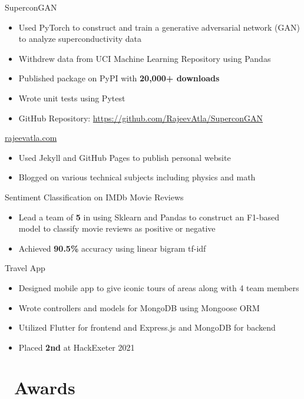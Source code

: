 \documentclass[12]{article}
\begin{document}
{SuperconGAN}
{
  \begin{itemize}
  \item Used PyTorch to construct and train a generative adversarial network (GAN) to analyze superconductivity data
  \item Withdrew data from UCI Machine Learning Repository using Pandas
  \item Published package on PyPI with \textbf{20,000+ downloads}
  \item Wrote unit tests using Pytest
  \item GitHub Repository: \url{https://github.com/RajeevAtla/SuperconGAN}
  \end{itemize}
}
\vspace{-1\baselineskip}
{\url{rajeevatla.com}}
{
  \begin{itemize}
  \item Used Jekyll and GitHub Pages to publish personal website
  \item Blogged on various technical subjects including physics and math
  \end{itemize}
}
\vspace{-1\baselineskip}
{Sentiment Classification on IMDb Movie Reviews}
{
  \begin{itemize}
  \item Lead a team of \textbf{5} in using Sklearn and Pandas to construct an F1-based model to classify movie reviews as positive or negative
  \item Achieved \textbf{90.5\%} accuracy using linear bigram tf-idf
  \end{itemize}
}
\vspace{-1\baselineskip}
{Travel App}
{
  \begin{itemize}
  \item Designed mobile app to give iconic tours of areas along with 4 team members
  \item Wrote controllers and models for MongoDB using Mongoose ORM
  \item Utilized Flutter for frontend and Express.js and MongoDB for backend
  \item Placed \textbf{2nd} at HackExeter 2021
  \end{itemize}
}
\vspace{-1\baselineskip}

\section{\faAward\ Awards}
\end{document}
